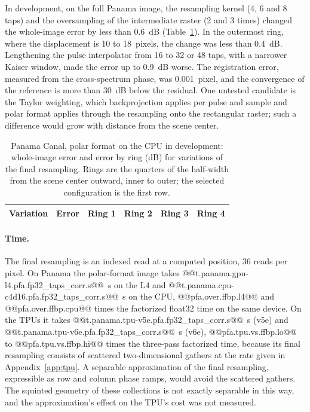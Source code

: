\documentclass[11pt]{article}
\begin{document}
In development, on the full Panama image, the resampling kernel (4, 6 and 8 taps) and the oversampling of the intermediate raster (2 and 3 times) changed the whole-image error by less than 0.6~dB (Table~\ref{tab:pfaedge}). In the outermost ring, where the displacement is 10 to 18~pixels, the change was less than 0.4~dB. Lengthening the pulse interpolator from 16 to 32 or 48 taps, with a narrower Kaiser window, made the error up to 0.9~dB worse. The registration error, measured from the cross-spectrum phase, was 0.001~pixel, and the convergence of the reference is more than 30~dB below the residual. One untested candidate is the Taylor weighting, which backprojection applies per pulse and sample and polar format applies through the resampling onto the rectangular raster; such a difference would grow with distance from the scene center.

\begin{table}[tbp]
\centering
\caption{Panama Canal, polar format on the CPU in development: whole-image error and error by ring (dB) for variations of the final resampling. Rings are the quarters of the half-width from the scene center outward, inner to outer; the selected configuration is the first row.}
\label{tab:pfaedge}
\small
\begin{tabular}{lrrrrr}
\toprule
Variation & Error & Ring 1 & Ring 2 & Ring 3 & Ring 4 \\
\midrule
\bottomrule
\end{tabular}
\end{table}

\paragraph{Time.} The final resampling is an indexed read at a computed position, 36 reads per pixel. On Panama the polar-format image takes @@t.panama.gpu-l4.pfa.fp32_taps_corr.s@@~s on the L4 and @@t.panama.cpu-c4d16.pfa.fp32_taps_corr.s@@~s on the CPU, @@pfa.over.ffbp.l4@@ and @@pfa.over.ffbp.cpu@@ times the factorized float32 time on the same device. On the TPUs it takes @@t.panama.tpu-v5e.pfa.fp32_taps_corr.s@@~s (v5e) and @@t.panama.tpu-v6e.pfa.fp32_taps_corr.s@@~s (v6e), @@pfa.tpu.vs.ffbp.lo@@ to @@pfa.tpu.vs.ffbp.hi@@ times the three-pass factorized time, because its final resampling consists of scattered two-dimensional gathers at the rate given in Appendix~\ref{app:tpu}. A separable approximation of the final resampling, expressible as row and column phase ramps, would avoid the scattered gathers. The squinted geometry of these collections is not exactly separable in this way, and the approximation's effect on the TPU's cost was not measured.
\end{document}
